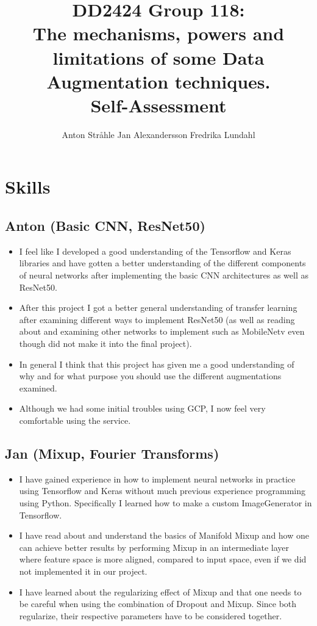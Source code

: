 \documentclass{article}
\title{DD2424 Group 118: \\ The mechanisms, powers and limitations of some Data Augmentation techniques. \\ Self-Assessment}
\author{%
  Anton Stråhle \And Jan Alexandersson \And Fredrika Lundahl}
\begin{document}
	
\maketitle

\section*{Skills}

\subsection*{Anton (Basic CNN, ResNet50)}

\begin{itemize}
 \item I feel like I developed a good understanding of the Tensorflow and Keras libraries and have gotten a better understanding of the different components of neural networks after implementing the basic CNN architectures as well as ResNet50. 
 \item After this project I got a better general understanding of transfer learning after examining different ways to implement ResNet50 (as well as reading about and examining other networks to implement such as MobileNetv even though did not make it into the final project). 
 \item In general I think that this project has given me a good understanding of why and for what purpose you should use the different augmentations examined.
 \item Although we had some initial troubles using GCP, I now feel very comfortable using the service.
\end{itemize}


\subsection*{Jan (Mixup, Fourier Transforms)}

\begin{itemize}
  \item I have gained experience in how to implement neural networks in practice using Tensorflow and Keras without much previous experience programming using Python. Specifically I learned how to make a custom ImageGenerator in Tensorflow.

  \item I have read about and understand the basics of Manifold Mixup and how one can achieve better results by performing Mixup in an intermediate layer where feature space is more aligned, compared to input space, even if we did not implemented it in our project.

  \item I have learned about the regularizing effect of Mixup and that one needs to be careful when using the combination of Dropout and Mixup. Since both regularize, their respective parameters have to be considered together.
\end{itemize}
\end{document}
